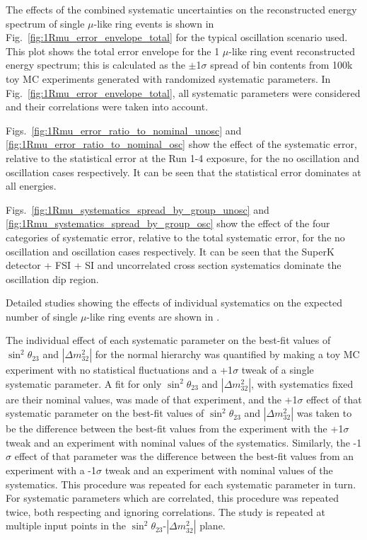 The effects of the combined systematic uncertainties on the reconstructed energy spectrum of single $\mu$-like ring events
is shown in Fig.\ \ref{fig:1Rmu_error_envelope_total} for the typical oscillation scenario used.
This plot shows the total error envelope for the 1 $\mu$-like ring event reconstructed energy spectrum; this is calculated
as the $\pm$1$\sigma$ spread of bin contents from 100k toy MC experiments generated with randomized systematic parameters.
In Fig.\ \ref{fig:1Rmu_error_envelope_total}, all systematic parameters were considered and their correlations were taken
into account.

Figs.\ \ref{fig:1Rmu_error_ratio_to_nominal_unosc} and \ref{fig:1Rmu_error_ratio_to_nominal_osc}
show the effect of the systematic error, relative to the statistical error
at the Run 1-4 exposure, for the no oscillation and oscillation cases respectively.
It can be seen that the statistical error dominates at all energies.

Figs.\ \ref{fig:1Rmu_systematics_spread_by_group_unosc} and \ref{fig:1Rmu_systematics_spread_by_group_osc}
show the effect of the four categories of systematic error,
relative to the total systematic error, for the no oscillation and oscillation cases respectively.
It can be seen that the SuperK detector + FSI + SI and
uncorrelated cross section systematics dominate the oscillation dip region.

Detailed studies showing the effects of individual systematics on the expected number of
single $\mu$-like ring events are shown in \cite{OurRun1234DisappAnalysisSupplement}.

The individual effect of each systematic parameter on the best-fit values of $\sin^{2}\theta_{23}$ and $|\Delta m^{2}_{32}|$ 
for the normal hierarchy was quantified by making a toy MC experiment with no statistical fluctuations and a +1$\sigma$ tweak of a 
single systematic parameter. A fit for only $\sin^2\theta_{23}$ and $|\Delta m^2_{32}|$, with systematics fixed
are their nominal values,
was made of that experiment, and the +1$\sigma$ effect of that systematic parameter on the 
best-fit values of $\sin^{2}\theta_{23}$ and $|\Delta m^{2}_{32}|$ was taken to be the difference between the best-fit values from 
the experiment with the +1$\sigma$ tweak and an experiment with nominal values of the systematics. Similarly, the -1$\sigma$ effect of that 
parameter was the difference between the best-fit values from an experiment with a -1$\sigma$ tweak and an experiment with 
nominal values of the systematics. This procedure was repeated for each systematic parameter in turn.
For systematic parameters which are correlated, this procedure was repeated twice, both respecting and ignoring correlations.
The study is repeated at multiple input points in the $\sin^{2}\theta_{23}$-$|\Delta m^{2}_{32}|$ plane.


